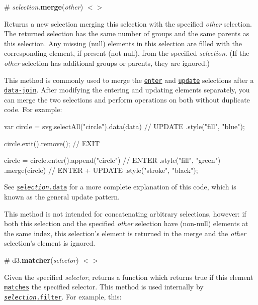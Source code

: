 \label{_selection_merge}%
\# {\itshape selection}.{\bfseries merge}({\itshape other}) \href{https://github.com/d3/d3-selection/blob/master/src/selection/merge.js}{\tt $<$$>$}

Returns a new selection merging this selection with the specified {\itshape other} selection. The returned selection has the same number of groups and the same parents as this selection. Any missing (null) elements in this selection are filled with the corresponding element, if present (not null), from the specified {\itshape selection}. (If the {\itshape other} selection has additional groups or parents, they are ignored.)

This method is commonly used to merge the \href{#selection_enter}{\tt enter} and \href{#selection_data}{\tt update} selections after a \href{#joining-data}{\tt data-\/join}. After modifying the entering and updating elements separately, you can merge the two selections and perform operations on both without duplicate code. For example\+:


\begin{DoxyCode}
var circle = svg.selectAll("circle").data(data) // UPDATE
    .style("fill", "blue");

circle.exit().remove(); // EXIT

circle = circle.enter().append("circle") // ENTER
    .style("fill", "green")
  .merge(circle) // ENTER + UPDATE
    .style("stroke", "black");
\end{DoxyCode}


See \href{#selection_data}{\tt {\itshape selection}.data} for a more complete explanation of this code, which is known as the general update pattern.

This method is not intended for concatenating arbitrary selections, however\+: if both this selection and the specified {\itshape other} selection have (non-\/null) elements at the same index, this selection’s element is returned in the merge and the {\itshape other} selection’s element is ignored.

\label{_matcher}%
\# d3.{\bfseries matcher}({\itshape selector}) \href{https://github.com/d3/d3-selection/blob/master/src/matcher.js}{\tt $<$$>$}

Given the specified {\itshape selector}, returns a function which returns true if {\ttfamily this} element \href{https://developer.mozilla.org/en-US/docs/Web/API/Element/matches}{\tt matches} the specified selector. This method is used internally by \href{#selection_filter}{\tt {\itshape selection}.filter}. For example, this\+:


